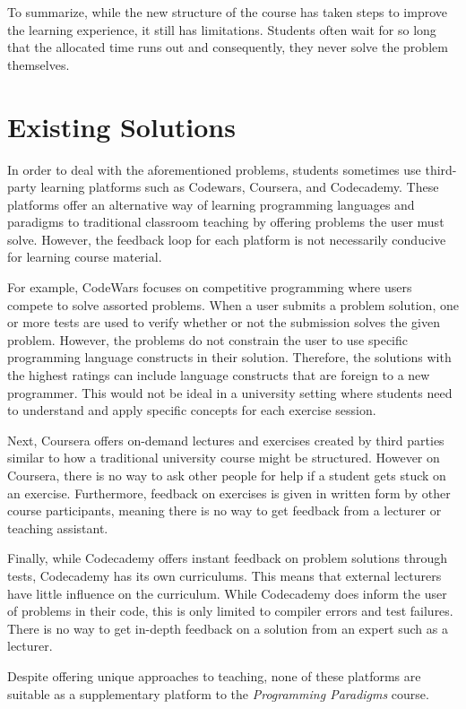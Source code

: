 To summarize, while the new structure of the course has taken steps to improve the learning experience, it still has limitations.
Students often wait for so long that the allocated time runs out and consequently, they never solve the problem themselves.

\section{Existing Solutions}
In order to deal with the aforementioned problems, students sometimes use third-party learning platforms such as Codewars\cite{Codewars}, Coursera\cite{Coursera}, and Codecademy\cite{Codecademy}.
These platforms offer an alternative way of learning programming languages and paradigms to traditional classroom teaching by offering problems the user must solve.
However, the feedback loop for each platform is not necessarily conducive for learning course material.


For example, CodeWars focuses on competitive programming where users compete to solve assorted problems.
When a user submits a problem solution, one or more tests are used to verify whether or not the submission solves the given problem.
However, the problems do not constrain the user to use specific programming language constructs in their solution.
Therefore, the solutions with the highest ratings can include language constructs that are foreign to a new programmer.
This would not be ideal in a university setting where students need to understand and apply specific concepts for each exercise session.


Next, Coursera offers on-demand lectures and exercises created by third parties similar to how a traditional university course might be structured.
However on Coursera, there is no way to ask other people for help if a student gets stuck on an exercise.
Furthermore, feedback on exercises is given in written form by other course participants, meaning there is no way to get feedback from a lecturer or teaching assistant.


Finally, while Codecademy offers instant feedback on problem solutions through tests, Codecademy has its own curriculums. This means that external lecturers have little influence on the curriculum.
While Codecademy does inform the user of problems in their code, this is only limited to compiler errors and test failures.
There is no way to get in-depth feedback on a solution from an expert such as a lecturer.

Despite offering unique approaches to teaching, none of these platforms are suitable as a supplementary platform to the \textit{Programming Paradigms} course.

